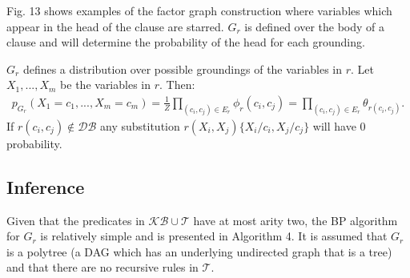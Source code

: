 \documentclass[11pt]{article}
\begin{document}
Fig. 13 shows examples of the factor graph construction where variables which appear in the head of the clause are starred.  $G_r$ is defined over the body of a clause and will determine the probability of the head for each grounding.

$G_r$ defines a distribution over possible groundings of the variables in $r$.  Let $X_1, ..., X_m$ be the variables in $r$.  Then:
\begin{gather*}
p_{G_r}(X_1 = c_1, ..., X_m = c_m) = \frac{1}{Z} \prod_{(c_i, c_j) \in E_r} \phi_r(c_i, c_j) = \prod_{(c_i, c_j) \in E_r} \theta_{r(c_i, c_j)}.
\end{gather*}
If $r(c_i, c_j) \notin \mathcal{DB}$ any substitution $r(X_i, X_j)\{X_i / c_i, X_j / c_j\}$ will have 0 probability.

\subsection{Inference}
Given that the predicates in $\mathcal{KB} \cup \mathcal{T}$ have at most arity two, the BP algorithm for $G_r$ is relatively simple and is presented in Algorithm 4.  It is assumed that $G_r$ is a polytree (a DAG which has an underlying undirected graph that is a tree) and that there are no recursive rules in $\mathcal{T}$.
\end{document}
